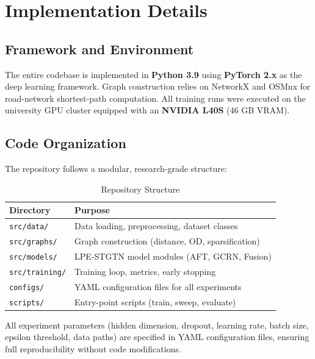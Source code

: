 \documentclass{rapportECL}
\begin{document}
\section{Implementation Details}

\subsection{Framework and Environment}
The entire codebase is implemented in \textbf{Python 3.9} using \textbf{PyTorch 2.x} as the deep learning framework. Graph construction relies on NetworkX and OSMnx for road-network shortest-path computation. All training runs were executed on the university GPU cluster equipped with an \textbf{NVIDIA L40S} (46 GB VRAM).

\subsection{Code Organization}
The repository follows a modular, research-grade structure:

\begin{table}[H]
\centering
\caption{Repository Structure}
\begin{tabular}{@{}ll@{}}
\toprule
\textbf{Directory} & \textbf{Purpose} \\ \midrule
\texttt{src/data/}    & Data loading, preprocessing, dataset classes \\
\texttt{src/graphs/}  & Graph construction (distance, OD, sparsification) \\
\texttt{src/models/}  & LPE-STGTN model modules (AFT, GCRN, Fusion) \\
\texttt{src/training/}& Training loop, metrics, early stopping \\
\texttt{configs/}     & YAML configuration files for all experiments \\
\texttt{scripts/}     & Entry-point scripts (train, sweep, evaluate) \\ \bottomrule
\end{tabular}
\end{table}

All experiment parameters (hidden dimension, dropout, learning rate, batch size, epsilon threshold, data paths) are specified in YAML configuration files, ensuring full reproducibility without code modifications.
\end{document}
